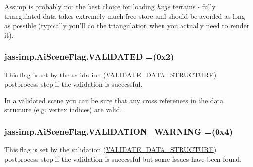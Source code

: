 \hyperlink{class_assimp}{Assimp} is probably not the best choice for loading {\itshape huge} terrains -\/ fully triangulated data takes extremely much free store and should be avoided as long as possible (typically you'll do the triangulation when you actually need to render it). \hypertarget{enumjassimp_1_1_ai_scene_flag_ac5df27f62c7e110d8feee7a6b36356b9}{
\subsubsection[{V\+A\+L\+I\+D\+A\+T\+E\+D}]{\setlength{\rightskip}{0pt plus 5cm}jassimp.\+Ai\+Scene\+Flag.\+V\+A\+L\+I\+D\+A\+T\+E\+D =(0x2)}}\label{enumjassimp_1_1_ai_scene_flag_ac5df27f62c7e110d8feee7a6b36356b9}
This flag is set by the validation (\hyperlink{enumjassimp_1_1_ai_post_process_steps_a67d8cbf3c7d36d28452d4aee89b81d01}{V\+A\+L\+I\+D\+A\+T\+E\+\_\+\+D\+A\+T\+A\+\_\+\+S\+T\+R\+U\+C\+T\+U\+R\+E}) postprocess-\/step if the validation is successful.

In a validated scene you can be sure that any cross references in the data structure (e.\+g. vertex indices) are valid. \hypertarget{enumjassimp_1_1_ai_scene_flag_a3e8366e5b14aabcd7a7e85ce3ba22adc}{
\subsubsection[{V\+A\+L\+I\+D\+A\+T\+I\+O\+N\+\_\+\+W\+A\+R\+N\+I\+N\+G}]{\setlength{\rightskip}{0pt plus 5cm}jassimp.\+Ai\+Scene\+Flag.\+V\+A\+L\+I\+D\+A\+T\+I\+O\+N\+\_\+\+W\+A\+R\+N\+I\+N\+G =(0x4)}}\label{enumjassimp_1_1_ai_scene_flag_a3e8366e5b14aabcd7a7e85ce3ba22adc}

\begin{DoxyItemize}
\item This flag is set by the validation (\hyperlink{enumjassimp_1_1_ai_post_process_steps_a67d8cbf3c7d36d28452d4aee89b81d01}{V\+A\+L\+I\+D\+A\+T\+E\+\_\+\+D\+A\+T\+A\+\_\+\+S\+T\+R\+U\+C\+T\+U\+R\+E}) postprocess-\/step if the validation is successful but some issues have been found.
\end{DoxyItemize}

